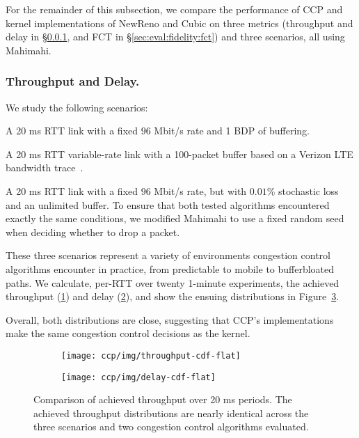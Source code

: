 For the remainder of this subsection, we compare the performance of CCP and kernel implementations of NewReno and Cubic on three metrics (throughput and delay in \S\ref{sec:eval:fidelity:tput-delay}, and FCT in \S\ref{sec:eval:fidelity:fct}) and three scenarios, all using Mahimahi.

\subsubsection{Throughput and Delay.}
\label{sec:eval:fidelity:tput-delay}

We study the following scenarios:

 A 20 ms RTT link with a fixed $96$ Mbit/s rate and 1 BDP of buffering.

 A 20 ms RTT variable-rate link with a 100-packet buffer based on a Verizon LTE bandwidth trace~\cite{mahimahi}.

 A 20 ms RTT link with a fixed $96$ Mbit/s rate, but with $0.01$\% stochastic loss and an unlimited buffer. To ensure that both tested algorithms encountered exactly the same conditions, we modified Mahimahi to use a fixed random seed when deciding whether to drop a packet.

These three scenarios represent a variety of environments congestion control algorithms encounter in practice, from predictable to mobile to bufferbloated paths. We calculate, per-RTT over twenty 1-minute experiments, the achieved throughput (\ref{fig:eval:fidelity:tput-cdf}) and delay (\ref{fig:eval:fidelity:delay-cdf}), and show the ensuing distributions in Figure~\ref{fig:eval:fidelity:cdfs}.

Overall, both distributions are close, suggesting that CCP's implementations make the same congestion control decisions as the kernel.

\begin{figure}[t]
\centering
\begin{subfigure}{\columnwidth}
\texttt{[image: ccp/img/throughput-cdf-flat]}
\label{fig:eval:fidelity:tput-cdf}
\end{subfigure}
%
\begin{subfigure}{\columnwidth}
\texttt{[image: ccp/img/delay-cdf-flat]}
\label{fig:eval:fidelity:delay-cdf}
\end{subfigure}
%
\caption{Comparison of achieved throughput over 20 ms periods. The achieved throughput distributions are nearly identical across the three scenarios and two congestion control algorithms evaluated.}\label{fig:eval:fidelity:cdfs}
\end{figure}

